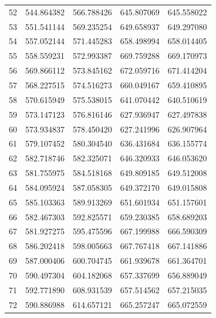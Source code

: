 \begin{table}
\begin{tabular}{rrrrr}
52 & 544.864382 & 566.788426 & 645.807069 & 645.558022 \\
53 & 551.541144 & 569.235254 & 649.658937 & 649.297080 \\
54 & 557.052144 & 571.445283 & 658.498994 & 658.014405 \\
55 & 558.559231 & 572.993387 & 669.759288 & 669.170973 \\
56 & 569.866112 & 573.845162 & 672.059716 & 671.414204 \\
57 & 568.227515 & 574.516273 & 660.049167 & 659.410895 \\
58 & 570.615949 & 575.538015 & 641.070442 & 640.510619 \\
59 & 573.147123 & 576.816146 & 627.936947 & 627.497838 \\
60 & 573.934837 & 578.450420 & 627.241996 & 626.907964 \\
61 & 579.107452 & 580.304540 & 636.431684 & 636.155774 \\
62 & 582.718746 & 582.325071 & 646.320933 & 646.053620 \\
63 & 581.755975 & 584.518168 & 649.809185 & 649.512008 \\
64 & 584.095924 & 587.058305 & 649.372170 & 649.015808 \\
65 & 585.103363 & 589.913269 & 651.601934 & 651.157601 \\
66 & 582.467303 & 592.825571 & 659.230385 & 658.689203 \\
67 & 581.927275 & 595.475596 & 667.199988 & 666.590309 \\
68 & 586.202418 & 598.005663 & 667.767418 & 667.141886 \\
69 & 587.000406 & 600.704745 & 661.939678 & 661.364701 \\
70 & 590.497304 & 604.182068 & 657.337699 & 656.889049 \\
71 & 592.771890 & 608.931539 & 657.514562 & 657.215035 \\
72 & 590.886988 & 614.657121 & 665.257247 & 665.072559 \\
\bottomrule
\end{tabular}
\end{table}
